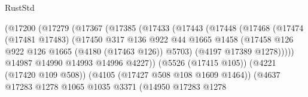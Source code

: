 \begin{lexlean}{RustStd}
\begin{coremodule}
                                        (@17200
                                          (@17279
                                            (@17367
                                              (@17385
                                                (@17433
                                                  (@17443
                                                    (@17448
                                                      (@17468
                                                        (@17474
                                                          (@17481 @17483)
                                                          (@17450
                                                            @317
                                                            @136
                                                            @922
                                                            @44
                                                            @1665
                                                            @1458
                                                            (@17458
                                                              @126
                                                              @922
                                                              @126
                                                              @1665
                                                              (@4180 (@17463 @126))
                                                              @5703)
                                                            (@4197 @17389 @1278)))))
                                                    @14987
                                                    @14990
                                                    @14993
                                                    @14996
                                                    @4227))
                                                (@5526 (@17415 @105))
                                                (@4221 (@17420 @109 @508))
                                                (@4105 (@17427 @508 @108 @1609 @1464))
                                                (@4637
                                                  @17283
                                                  @1278
                                                  @1065
                                                  @1035
                                                  @3371
                                                  (@14950
                                                    @17283
                                                    @1278

\end{coremodule}
\end{lexlean}
